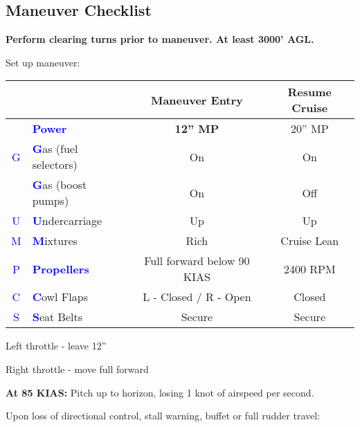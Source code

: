 \subsection{Maneuver Checklist}

\textbf{Perform clearing turns prior to maneuver. At least 3000' AGL.}

Set up maneuver:

\begin{table}[H]
\centering
\begin{tabular}{|c|l|c|c|}
\hline
                    &                                                 & \textbf{Maneuver Entry} & \textbf{Resume Cruise} \\ \hline
                    & \textcolor{blue}{\textbf{Power}}                & \textbf{12'' MP}        & 20'' MP                \\ \hline
\textcolor{blue}{G} & \textcolor{blue}{\textbf{G}}as (fuel selectors) & On                      & On                     \\
                    & \textcolor{blue}{\textbf{G}}as (boost pumps)    & On                      & Off                    \\ \hline
\textcolor{blue}{U} & \textcolor{blue}{\textbf{U}}ndercarriage        & Up                      & Up                     \\ \hline
\textcolor{blue}{M} & \textcolor{blue}{\textbf{M}}ixtures             & Rich                    & Cruise Lean            \\ \hline
\textcolor{blue}{P} & \textcolor{blue}{\textbf{Propellers}}           & Full forward below 90 KIAS & 2400 RPM            \\ \hline
\textcolor{blue}{C} & \textcolor{blue}{\textbf{C}}owl Flaps           & L - Closed / R - Open   & Closed                 \\ \hline
\textcolor{blue}{S} & \textcolor{blue}{\textbf{S}}eat Belts           & Secure                  & Secure                 \\ \hline
\end{tabular}
\end{table}

Left throttle - leave 12''

Right throttle - move full forward

\textbf{At 85 KIAS:} Pitch up to horizon, losing 1 knot of airspeed per second.

Upon loss of directional control, stall warning, buffet or full rudder travel:

